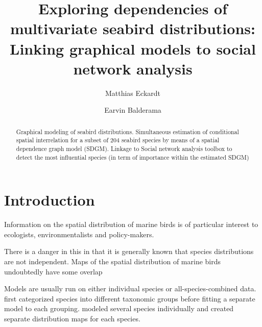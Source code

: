 \documentclass{statsoc}
\title[Graphical modeling of seabird distributions]{Exploring dependencies of multivariate seabird distributions: Linking graphical models to social network analysis}
\author[Author 1 {\it et al.}]{Matthias Eckardt}
\author{Earvin Balderama}
\begin{document}



\begin{abstract}
  Graphical modeling of seabird distributions. Simultaneous estimation of conditional spatial interrelation for a subset of $204$ seabird species by means of a spatial dependence graph model (SDGM). Linkage to Social network analysis toolbox to detect the most influential species (in term of importance within the estimated SDGM)  
\end{abstract}




\section{Introduction}



Information on the spatial distribution of marine birds is of particular interest to ecologists, environmentalists and policy-makers. 

There is a danger in this in that it is generally known that species distributions are not independent.
Maps of the spatial distribution of marine birds undoubtedly have some overlap

Models are usually run on either individual species or all-species-combined data. \cite{Winiarski2014} first categorized species into different taxonomic groups before fitting a separate model to each grouping. \cite{Balderama2016} modeled several species individually and created separate distribution maps for each species. 
\end{document}
